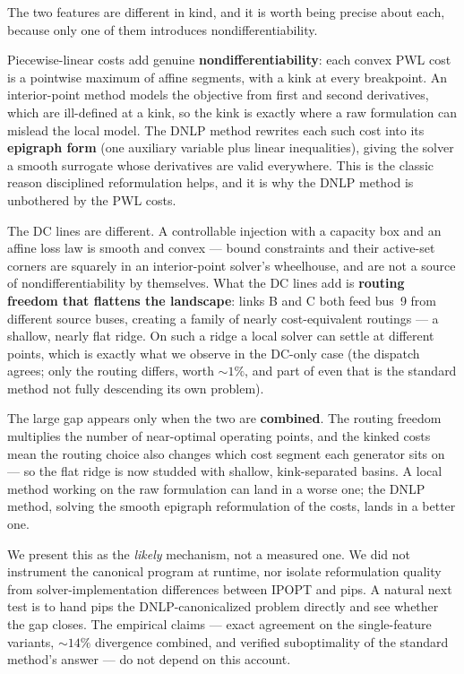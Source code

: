 \documentclass[11pt]{article}
\begin{document}
The two features are different in kind, and it is worth being precise about
each, because only one of them introduces nondifferentiability.

Piecewise-linear costs add genuine \textbf{nondifferentiability}: each convex
PWL cost is a pointwise maximum of affine segments, with a kink at every
breakpoint. An interior-point method models the objective from first and second
derivatives, which are ill-defined at a kink, so the kink is exactly where a
raw formulation can mislead the local model. The DNLP method rewrites each such
cost into its \textbf{epigraph form} (one auxiliary variable plus linear
inequalities), giving the solver a smooth surrogate whose derivatives are valid
everywhere. This is the classic reason disciplined reformulation helps, and it
is why the DNLP method is unbothered by the PWL costs.

The DC lines are different. A controllable injection with a capacity box and an
affine loss law is smooth and convex --- bound constraints and their active-set
corners are squarely in an interior-point solver's wheelhouse, and are not a
source of nondifferentiability by themselves. What the DC lines add is
\textbf{routing freedom that flattens the landscape}: links B and C both feed
bus~9 from different source buses, creating a family of nearly cost-equivalent
routings --- a shallow, nearly flat ridge. On such a ridge a local solver can
settle at different points, which is exactly what we observe in the DC-only case
(the dispatch agrees; only the routing differs, worth ${\sim}1\%$, and part of
even that is the standard method not fully descending its own problem).

The large gap appears only when the two are \textbf{combined}. The routing
freedom multiplies the number of near-optimal operating points, and the kinked
costs mean the routing choice also changes which cost segment each generator
sits on --- so the flat ridge is now studded with shallow, kink-separated
basins. A local method working on the raw formulation can land in a worse one;
the DNLP method, solving the smooth epigraph reformulation of the costs, lands
in a better one.

We present this as the \emph{likely} mechanism, not a measured one. We did not
instrument the canonical program at runtime, nor isolate reformulation quality
from solver-implementation differences between IPOPT and pips. A natural next
test is to hand pips the DNLP-canonicalized problem directly and see whether the
gap closes. The empirical claims --- exact agreement on the single-feature
variants, ${\sim}14\%$ divergence combined, and verified suboptimality of the
standard method's answer --- do not depend on this account.
\end{document}

